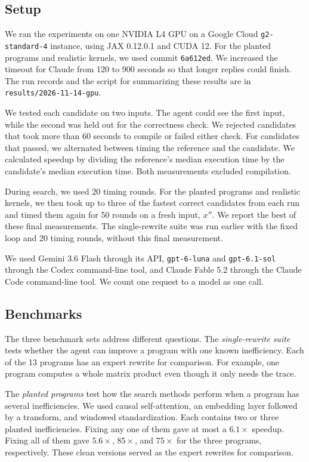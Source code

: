 \documentclass[conference]{IEEEtran}
\begin{document}
\subsection{Setup}

We ran the experiments on one NVIDIA L4 GPU on a Google Cloud
\texttt{g2-standard-4} instance, using JAX 0.12.0.1 and CUDA 12.
For the planted programs and realistic kernels, we used commit
\texttt{6a612ed}. We increased the timeout for Claude from 120 to 900
seconds so that longer replies could finish. The run records and the
script for summarizing these results are in
\texttt{results/2026-11-14-gpu}.

We tested each candidate on two inputs. The agent could see the first
input, while the second was held out for the correctness check. We
rejected candidates that took more than 60 seconds to compile or failed
either check. For candidates that passed, we alternated between timing
the reference and the candidate. We calculated speedup by dividing the
reference's median execution time by the candidate's median execution
time. Both measurements excluded compilation.

During search, we used 20 timing rounds. For the planted programs and
realistic kernels, we then took up to three of the fastest correct
candidates from each run and timed them again for 50 rounds on a fresh
input, $x''$. We report the best of these final measurements. The
single-rewrite suite was run earlier with the fixed loop and 20 timing
rounds, without this final measurement.

We used Gemini 3.6 Flash through its API, \texttt{gpt-6-luna} and
\texttt{gpt-6.1-sol} through the Codex command-line tool, and Claude
Fable 5.2 through the Claude Code command-line tool. We count one
request to a model as one call.

\subsection{Benchmarks}

The three benchmark sets address different questions. The
\emph{single-rewrite suite} tests whether the agent can improve a
program with one known inefficiency. Each of the 13 programs has an
expert rewrite for comparison. For example, one program computes a
whole matrix product even though it only needs the trace.

The \emph{planted programs} test how the search methods perform when a
program has several inefficiencies. We used causal self-attention, an
embedding layer followed by a transform, and windowed standardization.
Each contains two or three planted inefficiencies. Fixing any one of
them gave at most a $6.1\times$ speedup. Fixing all of them gave
$5.6\times$, $85\times$, and $75\times$ for the three programs,
respectively. These clean versions served as the expert rewrites for comparison.
\end{document}
